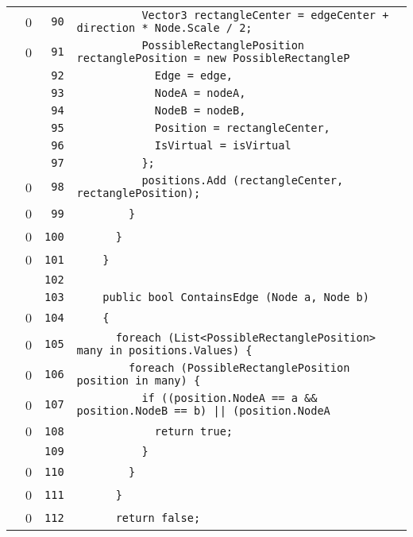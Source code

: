 \documentclass[a4paper,10pt]{article}
\begin{document}
\begin{longtable}[l]{lrrl}
\cellcolor{red} & 0 & \verb~90~ & \verb~          Vector3 rectangleCenter = edgeCenter + direction * Node.Scale / 2;~\\
\cellcolor{red} & 0 & \verb~91~ & \verb~          PossibleRectanglePosition rectanglePosition = new PossibleRectangleP~\\
\cellcolor{gray} &  & \verb~92~ & \verb~            Edge = edge,~\\
\cellcolor{gray} &  & \verb~93~ & \verb~            NodeA = nodeA,~\\
\cellcolor{gray} &  & \verb~94~ & \verb~            NodeB = nodeB,~\\
\cellcolor{gray} &  & \verb~95~ & \verb~            Position = rectangleCenter,~\\
\cellcolor{gray} &  & \verb~96~ & \verb~            IsVirtual = isVirtual~\\
\cellcolor{gray} &  & \verb~97~ & \verb~          };~\\
\cellcolor{red} & 0 & \verb~98~ & \verb~          positions.Add (rectangleCenter, rectanglePosition);~\\
\cellcolor{red} & 0 & \verb~99~ & \verb~        }~\\
\cellcolor{red} & 0 & \verb~100~ & \verb~      }~\\
\cellcolor{red} & 0 & \verb~101~ & \verb~    }~\\
\cellcolor{gray} &  & \verb~102~ & \verb~~\\
\cellcolor{gray} &  & \verb~103~ & \verb~    public bool ContainsEdge (Node a, Node b)~\\
\cellcolor{red} & 0 & \verb~104~ & \verb~    {~\\
\cellcolor{red} & 0 & \verb~105~ & \verb~      foreach (List<PossibleRectanglePosition> many in positions.Values) {~\\
\cellcolor{red} & 0 & \verb~106~ & \verb~        foreach (PossibleRectanglePosition position in many) {~\\
\cellcolor{red} & 0 & \verb~107~ & \verb~          if ((position.NodeA == a && position.NodeB == b) || (position.NodeA ~\\
\cellcolor{red} & 0 & \verb~108~ & \verb~            return true;~\\
\cellcolor{gray} &  & \verb~109~ & \verb~          }~\\
\cellcolor{red} & 0 & \verb~110~ & \verb~        }~\\
\cellcolor{red} & 0 & \verb~111~ & \verb~      }~\\
\cellcolor{red} & 0 & \verb~112~ & \verb~      return false;~\\

\end{longtable}
\end{document}
